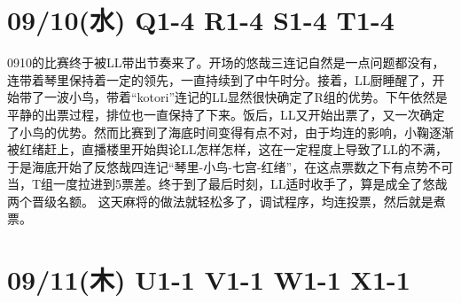 \section{09/10(水) Q1-4 R1-4 S1-4 T1-4}


0910的比赛终于被LL带出节奏来了。开场的悠哉三连记自然是一点问题都没有，连带着琴里保持着一定的领先，一直持续到了中午时分。接着，LL厨睡醒了，开始带了一波小鸟，带着“kotori”连记的LL显然很快确定了R组的优势。下午依然是平静的出票过程，排位也一直保持了下来。饭后，LL又开始出票了，又一次确定了小鸟的优势。然而比赛到了海底时间变得有点不对，由于均连的影响，小鞠逐渐被红绪赶上，直播楼里开始舆论LL怎样怎样，这在一定程度上导致了LL的不满，于是海底开始了反悠哉四连记“琴里-小鸟-七宫-红绪”，在这点票数之下有点势不可当，T组一度拉进到5票差。终于到了最后时刻，LL适时收手了，算是成全了悠哉两个晋级名额。
这天麻将的做法就轻松多了，调试程序，均连投票，然后就是煮票。

\section{09/11(木) U1-1 V1-1 W1-1 X1-1}

